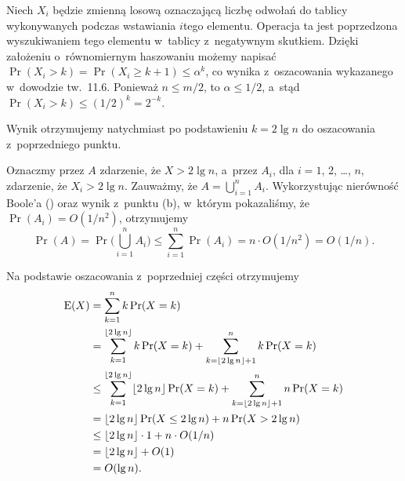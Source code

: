 \bignegskip

\subproblem %
Niech $X_i$ będzie zmienną losową oznaczającą liczbę odwołań do tablicy wykonywanych podczas wstawiania $i$\nbhyphen tego elementu.
Operacja ta jest poprzedzona wyszukiwaniem tego elementu w~tablicy z~negatywnym skutkiem.
Dzięki założeniu o~równomiernym haszowaniu możemy napisać $\Pr(X_i>k)=\Pr(X_i\ge k+1)\le\alpha^k$, co wynika z~oszacowania wykazanego w~dowodzie tw.\ 11.6.
Ponieważ $n\le m/2$, to $\alpha\le1/2$, a~stąd $\Pr(X_i>k)\le(1/2)^k=2^{-k}$.

\subproblem %
Wynik otrzymujemy natychmiast po podstawieniu $k=2\lg n$ do oszacowania z~poprzedniego punktu.

\subproblem %
Oznaczmy przez $A$ zdarzenie, że $X>2\lg n$, a~przez $A_i$, dla $i=1$, 2, \dots, $n$, zdarzenie, że $X_i>2\lg n$.
Zauważmy, że $A=\bigcup_{i=1}^nA_i$.
Wykorzystując nierówność Boole'a () oraz wynik z~punktu (b), w~którym pokazaliśmy, że $\Pr(A_i)=O(1/n^2)$, otrzymujemy
\[
	\Pr(A) = \Pr\biggl(\bigcup_{i=1}^nA_i\biggr) \le \sum_{i=1}^n\Pr(A_i) = n\cdot O(1/n^2) = O(1/n).
\]

\subproblem %
Na podstawie oszacowania z~poprzedniej części otrzymujemy
\begin{align*}
	\operatorname{E}(X) &= \sum_{k=1}^nk\Pr(X=k) \\
	&= \sum_{k=1}^{\lfloor2\lg n\rfloor}k\Pr(X=k)+\sum_{k=\lfloor2\lg n\rfloor+1}^nk\Pr(X=k) \\
	&\le \sum_{k=1}^{\lfloor2\lg n\rfloor}\lfloor2\lg n\rfloor\Pr(X=k)+\sum_{k=\lfloor2\lg n\rfloor+1}^nn\Pr(X=k) \\
	&= \lfloor2\lg n\rfloor\Pr(X\le2\lg n)+n\Pr(X>2\lg n) \\
	&\le \lfloor2\lg n\rfloor\cdot1+n\cdot O(1/n) \\
	&= \lfloor2\lg n\rfloor+O(1) \\
	&= O(\lg n).
\end{align*}
